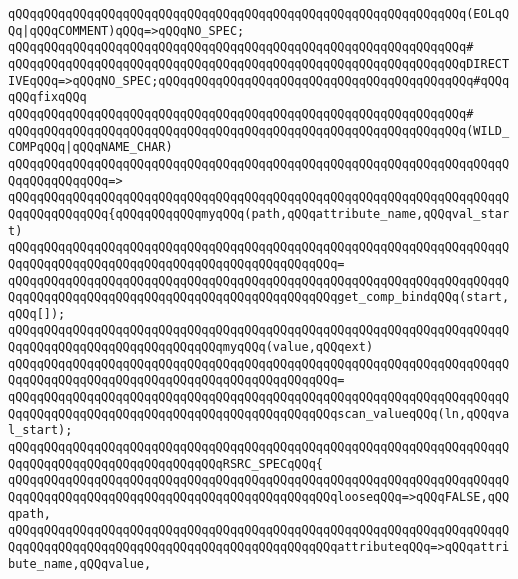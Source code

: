 \verb|qQQqqQQqqQQqqQQqqQQqqQQqqQQqqQQqqQQqqQQqqQQqqQQqqQQqqQQqqQQqqQQq(EOLqQQq|\verb#|qQQqCOMMENT)qQQq=>qQQqNO_SPEC;#\newline
\verb|qQQqqQQqqQQqqQQqqQQqqQQqqQQqqQQqqQQqqQQqqQQqqQQqqQQqqQQqqQQqqQQq#|\newline
\verb|qQQqqQQqqQQqqQQqqQQqqQQqqQQqqQQqqQQqqQQqqQQqqQQqqQQqqQQqqQQqqQQqDIRECTIVEqQQq=>qQQqNO_SPEC;qQQqqQQqqQQqqQQqqQQqqQQqqQQqqQQqqQQqqQQqqQQq#qQQqqQQqfixqQQq|\newline
\verb|qQQqqQQqqQQqqQQqqQQqqQQqqQQqqQQqqQQqqQQqqQQqqQQqqQQqqQQqqQQqqQQq#|\newline
\verb|qQQqqQQqqQQqqQQqqQQqqQQqqQQqqQQqqQQqqQQqqQQqqQQqqQQqqQQqqQQqqQQq(WILD_COMPqQQq|\verb#|qQQqNAME_CHAR)#\newline
\verb|qQQqqQQqqQQqqQQqqQQqqQQqqQQqqQQqqQQqqQQqqQQqqQQqqQQqqQQqqQQqqQQqqQQqqQQqqQQqqQQqqQQq=>|\newline
\verb|qQQqqQQqqQQqqQQqqQQqqQQqqQQqqQQqqQQqqQQqqQQqqQQqqQQqqQQqqQQqqQQqqQQqqQQqqQQqqQQqqQQq{qQQqqQQqqQQqmyqQQq(path,qQQqattribute_name,qQQqval_start)|\newline
\verb|qQQqqQQqqQQqqQQqqQQqqQQqqQQqqQQqqQQqqQQqqQQqqQQqqQQqqQQqqQQqqQQqqQQqqQQqqQQqqQQqqQQqqQQqqQQqqQQqqQQqqQQqqQQqqQQqqQQq=|\newline
\verb|qQQqqQQqqQQqqQQqqQQqqQQqqQQqqQQqqQQqqQQqqQQqqQQqqQQqqQQqqQQqqQQqqQQqqQQqqQQqqQQqqQQqqQQqqQQqqQQqqQQqqQQqqQQqqQQqqQQqget_comp_bindqQQq(start,qQQq[]);|\newline
\newline
\verb|qQQqqQQqqQQqqQQqqQQqqQQqqQQqqQQqqQQqqQQqqQQqqQQqqQQqqQQqqQQqqQQqqQQqqQQqqQQqqQQqqQQqqQQqqQQqqQQqqQQqmyqQQq(value,qQQqext)|\newline
\verb|qQQqqQQqqQQqqQQqqQQqqQQqqQQqqQQqqQQqqQQqqQQqqQQqqQQqqQQqqQQqqQQqqQQqqQQqqQQqqQQqqQQqqQQqqQQqqQQqqQQqqQQqqQQqqQQqqQQq=|\newline
\verb|qQQqqQQqqQQqqQQqqQQqqQQqqQQqqQQqqQQqqQQqqQQqqQQqqQQqqQQqqQQqqQQqqQQqqQQqqQQqqQQqqQQqqQQqqQQqqQQqqQQqqQQqqQQqqQQqqQQqscan_valueqQQq(ln,qQQqval_start);|\newline
\newline
\verb|qQQqqQQqqQQqqQQqqQQqqQQqqQQqqQQqqQQqqQQqqQQqqQQqqQQqqQQqqQQqqQQqqQQqqQQqqQQqqQQqqQQqqQQqqQQqqQQqqQQqRSRC_SPECqQQq{|\newline
\verb|qQQqqQQqqQQqqQQqqQQqqQQqqQQqqQQqqQQqqQQqqQQqqQQqqQQqqQQqqQQqqQQqqQQqqQQqqQQqqQQqqQQqqQQqqQQqqQQqqQQqqQQqqQQqqQQqqQQqlooseqQQq=>qQQqFALSE,qQQqpath,|\newline
\verb|qQQqqQQqqQQqqQQqqQQqqQQqqQQqqQQqqQQqqQQqqQQqqQQqqQQqqQQqqQQqqQQqqQQqqQQqqQQqqQQqqQQqqQQqqQQqqQQqqQQqqQQqqQQqqQQqqQQqattributeqQQq=>qQQqattribute_name,qQQqvalue,|\newline
